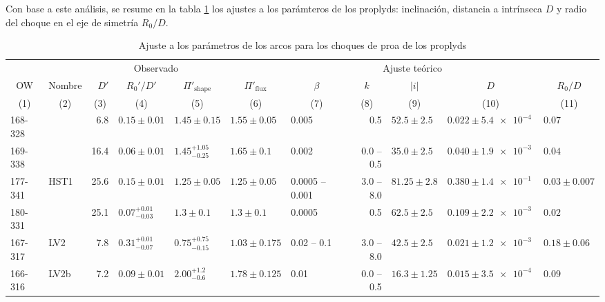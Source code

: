 Con base a este análisis, se resume en la tabla \ref{tab:arc-fits} los ajustes a los parámteros de los proplyds: inclinación, distancia a \thC{} intrínseca $D$ y radio del choque en el eje de simetría $R_0/D$.
\begin{landscape}
\begin{table}
  \caption{Ajuste a los parámetros de los arcos para los choques de proa de los proplyds}
  \label{tab:arc-fits} 
  \newcommand\C[1]{\multicolumn{1}{c}{#1}}
  \begin{adjustbox}{width=1.35\textwidth}
    \small
\begin{tabular}{llrllllrlll}\toprule
             &          & \multicolumn{3}{c}{\dotfill Observado \dotfill}              & \multicolumn{6}{c}{\dotfill Ajuste teórico \dotfill} \\ 
  \C{OW}     & \C{Nombre} & \(D'\) &\C{ \(R_0'/D'\) }&\C{ \(\Pi'_{\mathrm{shape}}\) }&\C{ \(\Pi'_{\mathrm{flux}}\) }&\C{ \(\beta\) }&\C{ \(k\) }&\C{ \(|i|\) }&\C{ \(D\) }&\C{ \(R_0/D\)}\\
  \C{(1)}& \C{ (2) }&\C{ (3)    }&\C{    (4)      }&\C{              (5)           }&\C{           (6)             }&\C{     (7)   }&\C{   (8)   }&\C{   (9) }&\C{  (10) }&\C{   (11)} \\
\midrule     
 168-328  &            &    6.8  &  $0.15 \pm 0.01$  &  $1.45 \pm 0.15$   &  $1.55 \pm 0.05$     &  0.005  &  0.5  &  $52.5 \pm 2.5$   &  $0.022 \pm \SI{5.4e-4}{}$  &  $0.07$  \\
 169-338  &            &  16.4  &  $0.06 \pm 0.01$  &  $1.45^{+1.05}_{-0.25}$   &  $1.65 \pm 0.1$     &  0.002  &  0.0 -- 0.5  &  $35.0 \pm 2.5$   &  $0.040 \pm \SI{1.9e-3}{}$  &  $0.04$  \\
 177-341  & HST1   & 25.6  &  $0.15 \pm 0.01$  &  $1.25 \pm 0.05$   &  $1.25 \pm 0.05$     &  0.0005 -- 0.001  &  3.0 -- 8.0  &  $81.25 \pm 2.8$   &  $0.380 \pm \SI{1.4e-1}{}$  &  $0.03 \pm 0.007$  \\
 180-331  &             &  25.1  &  $0.07^{+0.01}_{-0.03}$  &  $1.3 \pm 0.1$   &  $1.3 \pm 0.1$     &  0.0005  &  0.5  &  $62.5 \pm 2.5$   &  $0.109 \pm \SI{2.2e-3}{}$  &  $0.02$  \\
 167-317  &  LV2     &    7.8  &  $0.31^{+0.01}_{-0.07}$  &  $0.75^{+0.75}_{-0.15}$   &  $1.03 \pm 0.175$      &  0.02 -- 0.1  &  3.0 -- 8.0  &  $42.5 \pm 2.5$  &  $0.021 \pm \SI{1.2e-3}{}$  &  $0.18 \pm 0.06$  \\
 166-316  & LV2b    &   7.2  &  $0.09 \pm 0.01$  &  $2.00^{+1.2}_{-0.6}$   &  $1.78 \pm 0.125$     &  0.01  &  0.0 -- 0.5  &  $16.3 \pm 1.25$  &  $0.015 \pm \SI{3.5e-4}{}$  &  $0.09$  \\

\end{tabular}
\end{adjustbox}
\end{table}
\end{landscape}
